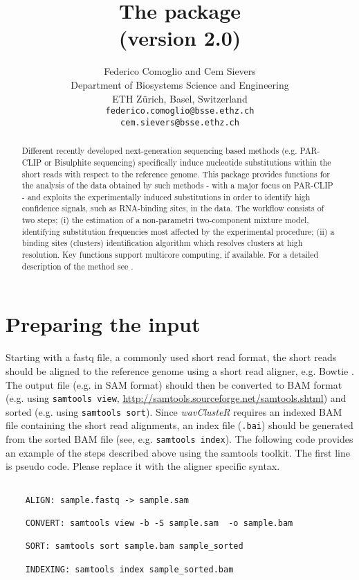 \documentclass{article}
\author{Federico Comoglio and Cem Sievers\\
Department of Biosystems Science and Engineering\\
ETH Z\"urich, Basel, Switzerland\\
\texttt{federico.comoglio@bsse.ethz.ch}\\
\texttt{cem.sievers@bsse.ethz.ch}}
\title{\textsf{\textbf{The \Rpackage{wavClusteR} package \\{\large (version 2.0)}}}}
\newcommand{\ext}[1]{\texttt{#1}}
\newcommand{\Rpackage}[1]{\textit{#1}}
\begin{document}
\maketitle
\begin{abstract}
Different recently developed next-generation sequencing based methods (e.g. PAR-CLIP or Bisulphite sequencing) specifically induce nucleotide substitutions within the short reads with respect to the reference genome. This package provides functions for the analysis of the data obtained by such methods - with a major focus on PAR-CLIP - and exploits the experimentally induced substitutions in order to identify high confidence signals, such as RNA-binding sites, in the data. The workflow consists of two steps; (i) the estimation of a non-parametri two-component mixture model, identifying substitution frequencies most affected by the experimental procedure; (ii) a binding sites (clusters) identification algorithm which resolves clusters at high resolution. Key functions support multicore computing, if available. For a detailed description of the method see \cite{cemo, cf}.
\end{abstract}

\tableofcontents

\section{Preparing the input} 

Starting with a fastq file, a commonly used short read format, the short reads should be aligned to the reference genome using a short read aligner, e.g. Bowtie \cite{Langmead:2009p2762}. The output file (e.g. in SAM format) should then be converted to BAM format (e.g. using \ext{samtools view}, \url{http://samtools.sourceforge.net/samtools.shtml}) and sorted (e.g. using \ext{samtools sort}). Since \Rpackage{wavClusteR} requires an indexed BAM file containing the short read alignments, an index file (\texttt{.bai}) should be generated from the sorted BAM file (see, e.g. \ext{samtools index}). \newline
The following code provides an example of the steps described above using the samtools toolkit. The first line is pseudo code. Please replace it with the aligner specific syntax.

\begin{verbatim}

	ALIGN: sample.fastq -> sample.sam
	
	CONVERT: samtools view -b -S sample.sam  -o sample.bam
	
	SORT: samtools sort sample.bam sample_sorted
	
	INDEXING: samtools index sample_sorted.bam

\end{verbatim}
\end{document}
